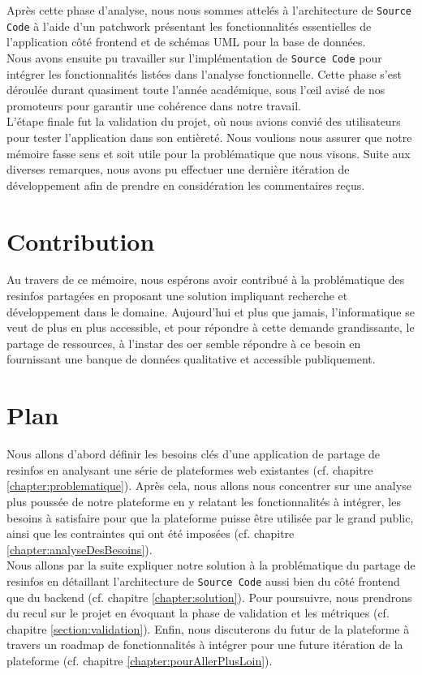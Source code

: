 Après cette phase d'analyse, nous nous sommes attelés à l'architecture de \texttt{Source Code} à l'aide d'un patchwork présentant les fonctionnalités essentielles de l'application côté \gls{frontend} et de schémas UML pour la base de données.\\

Nous avons ensuite pu travailler sur l'implémentation de \texttt{Source Code} pour intégrer les fonctionnalités listées dans l'analyse fonctionnelle. Cette phase s'est déroulée durant quasiment toute l'année académique, sous l'œil avisé de nos promoteurs pour garantir une cohérence dans notre travail.\\

L'étape finale fut la validation du projet, où nous avions convié des utilisateurs pour tester l'application dans son entièreté. Nous voulions nous assurer que notre mémoire fasse sens et soit utile pour la problématique que nous visons. Suite aux diverses remarques, nous avons pu effectuer une dernière itération de développement afin de prendre en considération les commentaires reçus.

\section*{Contribution}

Au travers de ce mémoire, nous espérons avoir contribué à la problématique des \glspl{resinfo} partagées en proposant une solution impliquant recherche et développement dans le domaine. Aujourd’hui et plus que jamais, l'informatique se veut de plus en plus accessible, et pour répondre à cette demande grandissante, le partage de ressources, à l'instar des \gls{oer} semble répondre à ce besoin en fournissant une banque de données qualitative et accessible publiquement.

\section*{Plan}

Nous allons d'abord définir les besoins clés d'une application de partage de \glspl{resinfo} en analysant une série de plateformes web existantes (cf. chapitre \ref{chapter:problematique}).
Après cela, nous allons nous concentrer sur une analyse plus poussée de notre plateforme en y relatant les fonctionnalités à intégrer, les besoins à satisfaire pour que la plateforme puisse être utilisée par le grand public, ainsi que les contraintes qui ont été imposées (cf. chapitre \ref{chapter:analyseDesBesoins}).\\

Nous allons par la suite expliquer notre solution à la problématique du partage de \glspl{resinfo} en détaillant l'architecture de \texttt{Source Code} aussi bien du côté \gls{frontend} que du \gls{backend} (cf. chapitre \ref{chapter:solution}).
Pour poursuivre, nous prendrons du recul sur le projet en évoquant la phase de validation et les métriques (cf. chapitre \ref{section:validation}). 
Enfin, nous discuterons du futur de la plateforme à travers un roadmap de fonctionnalités à intégrer pour une future itération de la plateforme (cf. chapitre \ref{chapter:pourAllerPlusLoin}).
